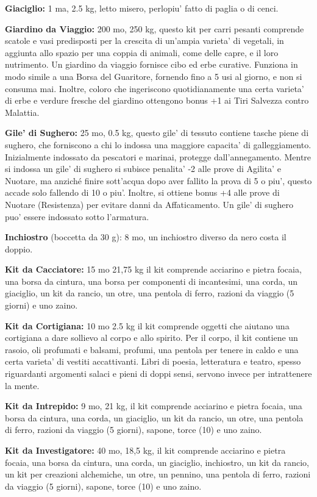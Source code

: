 \documentclass[a4paper,11pt,twoside,openany]{book}
\begin{document}
{\textbf{Giaciglio:} 1 ma, 2.5 kg, letto misero, perlopiu' fatto di paglia o di cenci.

\textbf{Giardino da Viaggio:} 200 mo, 250 kg, questo kit per carri pesanti comprende scatole e vasi predispo­sti per la crescita di un'ampia varieta' di vegetali, in aggiunta allo spazio per una coppia di animali, come delle capre, e il loro nutrimento. Un giardino da viaggio fornisce cibo ed erbe curative. Funziona in modo simile a una Borsa del Guaritore, fornendo fino a 5 usi al giorno, e non si consuma mai. Inoltre, coloro che ingeriscono quotidianamente una certa varieta' di ­erbe e verdure fresche del giardino ottengono bonus +1 ai Tiri Salvezza contro Malattia. 

\textbf{Gile' di Sughero:} 25 mo, 0.5 kg, questo gile' di tessuto contiene tasche piene di sughero, che forniscono a chi lo indossa una maggiore capacita' di galleggiamento. Inizialmente indossato da pescatori e marinai, protegge dall'annegamento. Mentre si indossa un gile' di sughero si subisce penalita' -2 alle prove di Agilita' e Nuotare, ma anziché finire sott'acqua dopo aver fallito la prova di 5 o piu', questo accade solo fallendo di 10 o piu'. Inoltre, si ottiene bonus +4 alle prove di Nuotare (Resistenza) per evitare danni da Affaticamento. Un gile' di sughero puo' essere indossato sotto l'armatura.

\textbf{Inchiostro} (boccetta da 30 g): 8 mo, un inchiostro diverso da nero costa il doppio.

\textbf{Kit da Cacciatore:} 15 mo 21,75 kg il kit comprende acciarino e pietra focaia, una borsa da cin­tura, una borsa per componenti di incantesimi, una corda, un giaciglio, un kit da rancio, un otre, una pentola di ferro, razioni da viaggio (5 giorni) e uno zaino.

\textbf{Kit da Cortigiana:} 10 mo 2.5 kg il kit comprende oggetti che aiutano una cortigiana a dare sollievo al corpo e allo spirito. Per il corpo, il kit contiene un rasoio, oli profumati e balsami, profumi, una pentola per tenere in caldo e una certa varieta' di vestiti accattivanti. Libri di poesia, letteratura e teatro, spesso riguardanti argomenti salaci e pieni di doppi sensi, servono invece per intrattenere la mente.

\textbf{Kit da Intrepido:} 9 mo, 21 kg, il kit comprende acciarino e pietra focaia, una borsa da cin­tura, una corda, un giaciglio, un kit da rancio, un otre, una pentola di ferro, razioni da viaggio (5 giorni), sapone, torce (10) e uno zaino.

\textbf{Kit da Investigatore:} 40 mo, 18,5 kg, il kit comprende acciarino e pietra focaia, una borsa da cin­tura, una corda, un giaciglio, inchiostro, un kit da rancio, un kit per creazioni alchemiche, un otre, un pennino, una pentola di ferro, razioni da viaggio (5 giorni), sapone, torce (10) e uno zaino.

}
\end{document}
